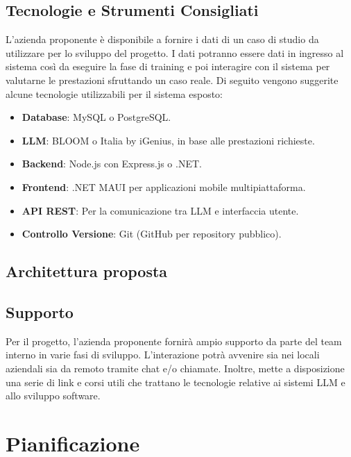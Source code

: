 \documentclass{article}
\begin{document}
    \subsection{Tecnologie e Strumenti Consigliati}
    L’azienda proponente è disponibile a fornire i dati di un caso di studio da utilizzare
    per lo sviluppo del progetto. I dati potranno essere dati in ingresso al sistema così da eseguire la fase di
    training e poi interagire con il sistema per valutarne le prestazioni sfruttando un caso reale.
    Di seguito vengono suggerite alcune tecnologie utilizzabili per il sistema esposto:
    \begin{itemize}
        \item \textbf{Database}: MySQL o PostgreSQL.
        \item \textbf{LLM}: BLOOM o Italia by iGenius, in base alle prestazioni richieste.
        \item \textbf{Backend}: Node.js con Express.js o .NET.
        \item \textbf{Frontend}: .NET MAUI per applicazioni mobile multipiattaforma.
        \item \textbf{API REST}: Per la comunicazione tra LLM e interfaccia utente.
        \item \textbf{Controllo Versione}: Git (GitHub per repository pubblico).
    \end{itemize}

    \subsection{Architettura proposta}

    \subsection{Supporto}
    Per il progetto, l’azienda proponente fornirà ampio supporto da parte del team interno in varie fasi
    di sviluppo. L’interazione potrà avvenire sia nei locali aziendali sia da remoto tramite chat e/o chiamate. 
    Inoltre, mette a disposizione una serie di link e corsi utili che trattano le tecnologie relative ai sistemi
    LLM e allo sviluppo software.




\newpage
\section{Pianificazione}
\end{document}

